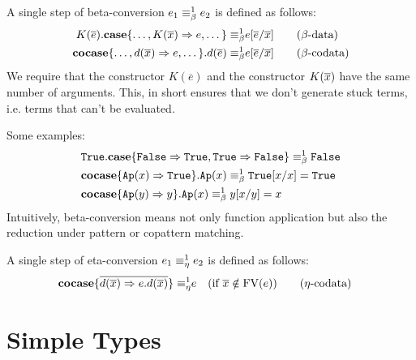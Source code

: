 \documentclass[twoside,12pt,a4paper]{article}
\begin{document}
\begin{definition}
    A single step of beta-conversion $e_1 \equiv_{\beta}^1 e_2$ is defined as follows:
    \begin{align*}
        K(\overline{e}).\textbf{case}\{\dots,K(\overline{x})\Rightarrow e,\dots\} 
        \equiv_{\beta}^1 & e[\overline{e}/\overline{x}] \tag{$\beta$-data}\\
        \textbf{cocase}\{\dots,d(\overline{x}) \Rightarrow e, \dots\}.d(\overline{e})
        \equiv_{\beta}^1 & e[\overline{e}/\overline{x}]  \tag{$\beta$-codata}
    \end{align*}
    We require that the constructor $K(\overline{e})$ and the constructor $K(\overline{x})$ have the same number of arguments.
    This, in short ensures that we don't generate stuck terms, i.e. terms that can't be evaluated. %
\end{definition}
Some examples:
\begin{align*}
    &\mathtt{True}.\textbf{case}\{\mathtt{False}\Rightarrow \mathtt{True}, \mathtt{True} \Rightarrow \mathtt{False}\}\equiv_{\beta}^1\mathtt{False}\\
    &\textbf{cocase}\{\texttt{Ap}(x)\Rightarrow \mathtt{True}\}.\texttt{Ap}(x)\equiv_{\beta}^1 \mathtt{True}[x/x] = \mathtt{True} \\
    &\textbf{cocase}\{\texttt{Ap}(y)\Rightarrow y\}.\texttt{Ap}(x) \equiv_{\beta}^1 y[x/y]= x
\end{align*}
Intuitively, beta-conversion means not only function application but also the reduction under pattern or copattern matching. %

\begin{definition}
    A single step of eta-conversion $e_1 \equiv_{\eta}^1 e_2$ is defined as follows:
    \begin{align*}
        \textbf{cocase}\{\overline{d(\overline{x})\Rightarrow e.d(\overline{x})}\}
        \equiv_{\eta}^1 & e \quad (\text{if } \overline{x}\notin \text{FV}(e)) \tag{$\eta$-codata}
    \end{align*}
\end{definition}

\section{Simple Types}
\end{document}
